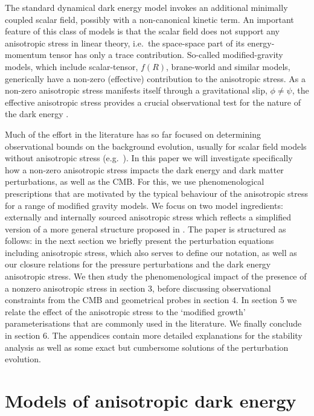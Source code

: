 The standard dynamical dark energy model invokes an additional minimally coupled scalar 
field, possibly with a non-canonical kinetic term. An important feature of this 
class of models is that the scalar field does not support any anisotropic stress 
in linear theory, i.e.\ the space-space part of its energy-momentum tensor has only a 
trace contribution. So-called modified-gravity models, which include 
scalar-tensor, $f(R)$, brane-world and similar models, generically have a non-zero 
(effective) contribution to the anisotropic stress. As a non-zero anisotropic 
stress manifests itself through a gravitational slip, $\phi\neq\psi$, the 
effective anisotropic stress provides a crucial observational test for the nature 
of the dark energy \cite{Kunz:2006ca, Saltas:2010tt}.

Much of the effort in the literature has so far focused on determining 
observational bounds on the background evolution, usually for scalar field models 
without anisotropic stress (e.g.\ \cite{Copeland:2006wr, Frieman:2008sn,Sapone:2010iz,Amendola:2012ys}). 
In this paper we will investigate specifically how a non-zero 
anisotropic stress impacts the dark energy and dark matter perturbations, as well 
as the CMB. For this, we use phenomenological prescriptions that are 
motivated by the typical behaviour of the anisotropic stress for a range of 
modified gravity models. We focus on two model ingredients: externally and 
internally sourced anisotropic stress which reflects a simplified version of a 
more general structure proposed in \cite{Sawicki:2012re}. The paper is structured 
as follows: in the next section we briefly present the perturbation equations 
including anisotropic stress, which also serves to define our notation, as well as 
our closure relations for the pressure perturbations and the dark energy 
anisotropic stress. We then study the phenomenological impact of the presence of a 
nonzero anisotropic stress in section 3, before discussing observational 
constraints from the CMB and geometrical probes in section 4. In section 5 we 
relate the effect of the anisotropic stress to the `modified growth' 
parameterisations that are commonly used in the literature.  We finally conclude 
in section 6. The appendices contain more detailed explanations for the stability 
analysis as well as some exact but cumbersome solutions of the perturbation 
evolution.

\section{Models of anisotropic dark energy}
\label{chapter-ade:models}

